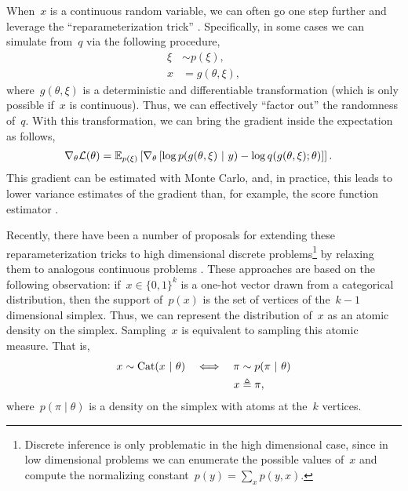\documentclass{article}
\begin{document}
When~$x$ is a continuous random variable, we can often go one step
further and leverage the ``reparameterization trick''  \citep{Salimans2013,Kingma2014,Price1958,Bonnet1964}.  Specifically,
in some cases we can simulate from~$q$ via the following procedure,
\begin{align}
\xi &\sim p(\xi),  \\
x &= g(\theta, \xi),
\end{align}
where~$g(\theta, \xi)$ is a deterministic and differentiable
transformation (which is only possible if~$x$ is continuous). Thus, we
can effectively ``factor out'' the randomness of~$q$. With this
transformation, we can bring the gradient inside the expectation as
follows,
\begin{align}
  \nabla_\theta \mathcal{L}(\theta) 
  &= \mathbb{E}_{p(\xi)} \left[ \nabla_\theta \left[\log p(g(\theta, \xi) ~\vert~ y) - \log q(g(\theta, \xi); \theta) \right] \right].
\end{align}
This gradient can be estimated with Monte Carlo, and, in practice,
this leads to lower variance estimates of the gradient than, for
example, the score function estimator \citep{Williams1992,Glynn1990}.




Recently, there have been a number of proposals for extending these
reparameterization tricks to high dimensional discrete
problems\footnote{Discrete inference is only problematic in the high
dimensional case, since in low dimensional problems we can enumerate
the possible values of~$x$ and compute the normalizing constant~$p(y)
= \sum_x p(y, x)$.} by relaxing them to analogous continuous
problems \citep{maddison2016concrete, jang2016categorical,
kusner2016gans}.  These approaches are based on the following
observation: if~$x \in \{0,1\}^k$ is a one-hot vector drawn from a
categorical distribution, then the support of~$p(x)$ is the set of
vertices of the~$k-1$ dimensional simplex.  Thus, we can represent the
distribution of~$x$ as an atomic density on the simplex.  Sampling~$x$
is equivalent to sampling this atomic measure. That is,
\begin{align}
  x &\sim \mathrm{Cat}( x ~\vert~ \theta) &\iff& & {\pi} &\sim p({\pi} ~\vert~ \theta) \nonumber \\
  & & & & x &\triangleq {\pi},
\end{align}
where~$p({\pi} \mid \theta)$ is a density on the simplex with atoms at
the~$k$ vertices.
\end{document}
